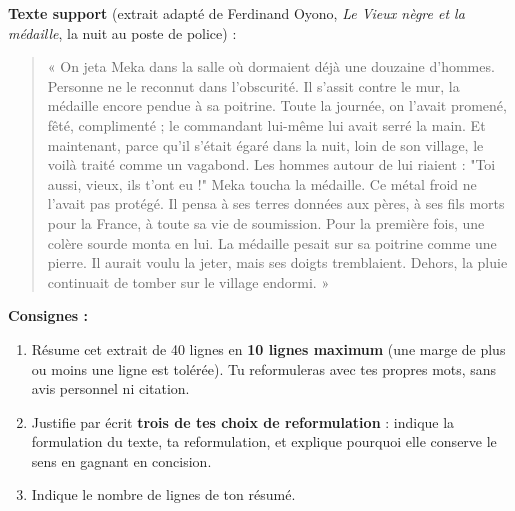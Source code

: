 \documentclass[11pt]{article}
\begin{document}
\begin{exercice}
\textbf{Texte support} (extrait adapté de Ferdinand Oyono, \emph{Le Vieux nègre et la médaille}, la nuit au poste de police) :
\begin{quote}
« On jeta Meka dans la salle où dormaient déjà une douzaine d'hommes. Personne ne le reconnut dans l'obscurité. Il s'assit contre le mur, la médaille encore pendue à sa poitrine. Toute la journée, on l'avait promené, fêté, complimenté ; le commandant lui-même lui avait serré la main. Et maintenant, parce qu'il s'était égaré dans la nuit, loin de son village, le voilà traité comme un vagabond. Les hommes autour de lui riaient : "Toi aussi, vieux, ils t'ont eu !" Meka toucha la médaille. Ce métal froid ne l'avait pas protégé. Il pensa à ses terres données aux pères, à ses fils morts pour la France, à toute sa vie de soumission. Pour la première fois, une colère sourde monta en lui. La médaille pesait sur sa poitrine comme une pierre. Il aurait voulu la jeter, mais ses doigts tremblaient. Dehors, la pluie continuait de tomber sur le village endormi. »
\end{quote}
\textbf{Consignes :}
\begin{enumerate}
\item Résume cet extrait de 40 lignes en \textbf{10 lignes maximum} (une marge de plus ou moins une ligne est tolérée). Tu reformuleras avec tes propres mots, sans avis personnel ni citation.
\item Justifie par écrit \textbf{trois de tes choix de reformulation} : indique la formulation du texte, ta reformulation, et explique pourquoi elle conserve le sens en gagnant en concision.
\item Indique le nombre de lignes de ton résumé.
\end{enumerate}
\end{exercice}
\end{document}
